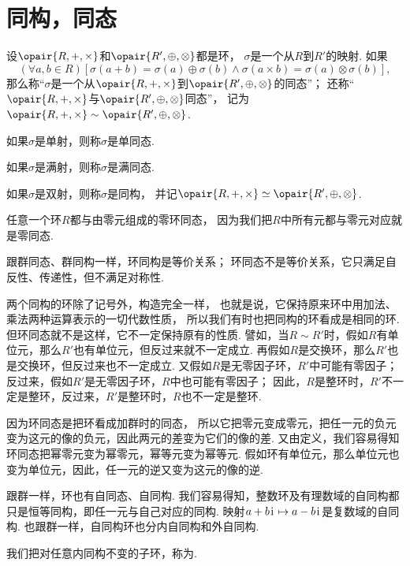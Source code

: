 \section{同构，同态}
\begin{definition}
设\(\opair{R,+,\times}\)和\(\opair{R',\oplus,\otimes}\)都是环，
\(\sigma\)是一个从\(R\)到\(R'\)的映射.
如果\[
	(\forall a,b\in R)[
		\sigma(a+b)=\sigma(a)\oplus\sigma(b)
		\land
		\sigma(a \times b)=\sigma(a)\otimes\sigma(b)
	],
\]
那么称“\(\sigma\)是一个从\(\opair{R,+,\times}\)到\(\opair{R',\oplus,\otimes}\)的同态”；
还称“\(\opair{R,+,\times}\)与\(\opair{R',\oplus,\otimes}\)同态”，
记为\(\opair{R,+,\times} \sim \opair{R',\oplus,\otimes}\).

如果\(\sigma\)是单射，则称\(\sigma\)是单同态.

如果\(\sigma\)是满射，则称\(\sigma\)是满同态.

如果\(\sigma\)是双射，则称\(\sigma\)是同构，
并记\(\opair{R,+,\times} \simeq \opair{R',\oplus,\otimes}\).
\end{definition}

任意一个环\(R\)都与由零元组成的零环同态，
因为我们把\(R\)中所有元都与零元对应就是零同态.

跟群同态、群同构一样，环同构是等价关系；
环同态不是等价关系，它只满足自反性、传递性，但不满足对称性.

两个同构的环除了记号外，构造完全一样，
也就是说，它保持原来环中用加法、乘法两种运算表示的一切代数性质，
所以我们有时也把同构的环看成是相同的环.
但环同态就不是这样，它不一定保持原有的性质.
譬如，当\(R \sim R'\)时，假如\(R\)有单位元，那么\(R'\)也有单位元，但反过来就不一定成立.
再假如\(R\)是交换环，那么\(R'\)也是交换环，但反过来也不一定成立.
又假如\(R\)是无零因子环，\(R'\)中可能有零因子；
反过来，假如\(R'\)是无零因子环，\(R\)中也可能有零因子；
因此，\(R\)是整环时，\(R'\)不一定是整环，反过来，\(R'\)是整环时，\(R\)也不一定是整环.

因为环同态是把环看成加群时的同态，
所以它把零元变成零元，把任一元的负元变为这元的像的负元，因此两元的差变为它们的像的差.
又由定义，我们容易得知环同态把幂零元变为幂零元，幂等元变为幂等元.
假如环有单位元，那么单位元也变为单位元，因此，任一元的逆又变为这元的像的逆.

跟群一样，环也有自同态、自同构.
我们容易得知，整数环及有理数域的自同构都只是恒等同构，即任一元与自己对应的同构.
映射\(a+b\kern1pt\mathrm{i}\kern1pt \mapsto a-b\kern1pt\mathrm{i}\kern1pt\)是复数域的自同构.
也跟群一样，自同构环也分内自同构和外自同构.

我们把对任意内同构不变的子环，称为.

